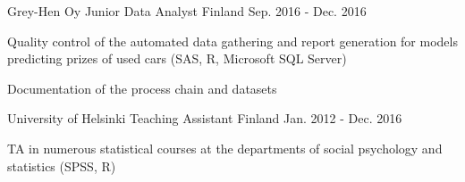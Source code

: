 \begin{cventries}
  \cventry
    {Grey-Hen Oy} %
    {Junior Data Analyst} %
    {Finland} %
    {Sep. 2016 - Dec. 2016} %
    {
      \begin{cvitems} %
        \item {Quality control of the automated data gathering and report generation for models predicting prizes of used cars (SAS, R, Microsoft SQL Server)}
        \item {Documentation of the process chain and datasets}
      \end{cvitems}
    }

  \cventry
    {University of Helsinki} %
    {Teaching Assistant} %
    {Finland} %
    {Jan. 2012 - Dec. 2016} %
    {
      \begin{cvitems} %
        \item {TA in numerous statistical courses at the departments of social psychology and statistics (SPSS, R)}
      \end{cvitems}
    }

\end{cventries}

